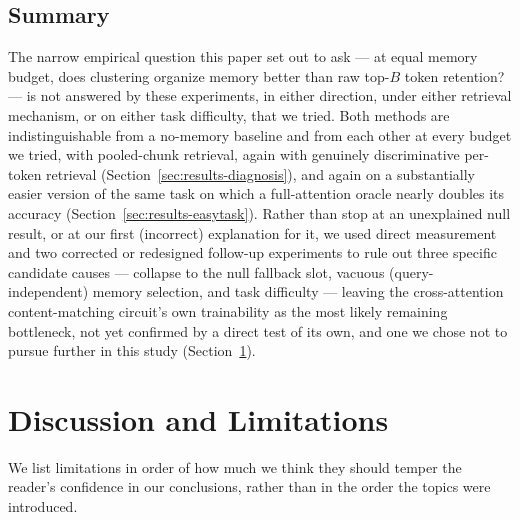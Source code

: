 \documentclass[11pt]{article}
\begin{document}
\subsection{Summary}
The narrow empirical question this paper set out to ask --- at equal memory budget, does
clustering organize memory better than raw top-$B$ token retention? --- is not answered by these
experiments, in either direction, under either retrieval mechanism, or on either task difficulty,
that we tried. Both methods are indistinguishable from a no-memory baseline and from each other at
every budget we tried, with pooled-chunk retrieval, again with genuinely discriminative per-token
retrieval (Section~\ref{sec:results-diagnosis}), and again on a substantially easier version of
the same task on which a full-attention oracle nearly doubles its accuracy
(Section~\ref{sec:results-easytask}). Rather than stop at an unexplained null result, or at our
first (incorrect) explanation for it, we used direct measurement and two corrected or redesigned
follow-up experiments to rule out three specific candidate causes --- collapse to the null
fallback slot, vacuous (query-independent) memory selection, and task difficulty --- leaving the
cross-attention content-matching circuit's own trainability as the most likely remaining
bottleneck, not yet confirmed by a direct test of its own, and one we chose not to pursue further
in this study (Section~\ref{sec:limitations}).

\section{Discussion and Limitations}
\label{sec:limitations}

We list limitations in order of how much we think they should temper the reader's confidence in
our conclusions, rather than in the order the topics were introduced.
\end{document}
